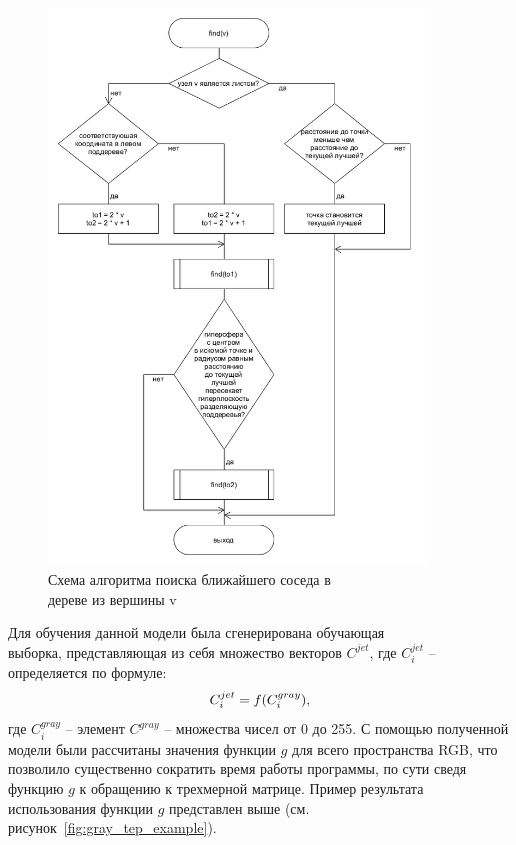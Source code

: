 \documentclass[14pt, a4paper]{extreport}
\begin{document}
	\begin{figure}[h!]
		\centering
		\includegraphics[width = 0.9\textwidth]{image/chapter_2/kdtreealgo}	
		\caption{Схема алгоритма поиска ближайшего соседа в \\ дереве из вершины v}
		\label{fig:kdtreealgo}
	\end{figure}
	
	Для обучения данной модели была сгенерирована обучающая \\ выборка, представляющая из себя множество векторов $C^{jet}$, где $C^{jet}_{i}$ -- определяется по формуле:
	\vspace*{-0.3cm}
	\begin{equation}
		C^{jet}_{i} = f(C^{gray}_{i}),
		\label{eq:Cjetgray}
		\vspace*{-0.35cm}
	\end{equation}
	где $C^{gray}_{i}$ -- элемент $C^{gray}$ -- множества чисел от 0 до 255. С помощью полученной модели были рассчитаны значения функции $g$ для всего пространства RGB, что позволило существенно сократить время работы программы, по сути сведя функцию $g$ к обращению к трехмерной матрице. Пример результата использования функции $g$ представлен выше (см. рисунок~\ref{fig:gray_tep_example}).
	
\end{document}
